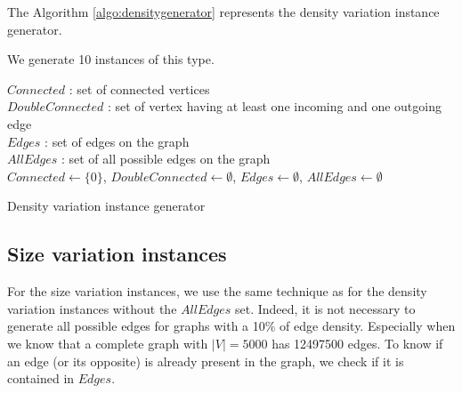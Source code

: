 The Algorithm \ref{algo:densitygenerator} represents the density variation instance generator.

We generate 10 instances of this type.


\begin{algorithm}
 $Connected$ : set of connected vertices \\
 $DoubleConnected$ : set of vertex having at least one incoming and one outgoing edge \\
 $Edges$ : set of edges on the graph \\
 $AllEdges$ : set of all possible edges on the graph\\
 $Connected \gets \{0\}$, $DoubleConnected\gets \emptyset$, $Edges\gets \emptyset$, $AllEdges\gets \emptyset$\;
 



 \caption{Density variation instance generator}
 \label{algo:densitygenerator}
\end{algorithm}

\subsection{Size variation instances}
For the size variation instances, we use the same technique as for the density variation instances without the $AllEdges$ set. Indeed, it is not necessary to generate all possible edges for graphs with a 10\% of edge density. Especially when we know that a complete graph with $|V|=5000$ has 12497500 edges. To know if an edge (or its opposite) is already present in the graph, we check if it is contained in $Edges$.

